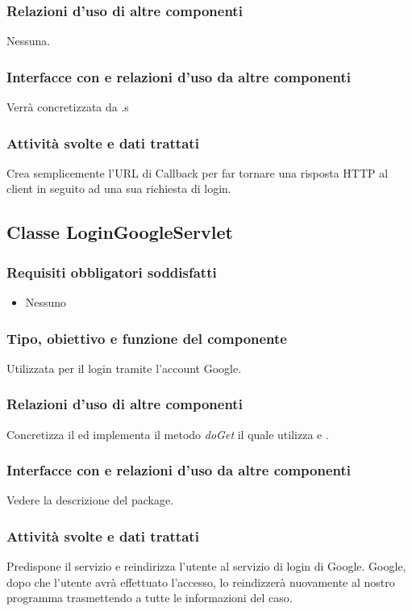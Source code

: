 \subsubsection*{Relazioni d'uso di altre componenti}
Nessuna.
\subsubsection*{Interfacce con e relazioni d'uso da altre componenti}
Verr\`a concretizzata da .s
\subsubsection*{Attivit\`a svolte e dati trattati}
Crea semplicemente l'URL di Callback per far tornare una risposta HTTP al
client in seguito ad una sua richiesta di login.

\subsection{Classe LoginGoogleServlet}
\subsubsection*{Requisiti obbligatori soddisfatti}
\begin{itemize}
    \item Nessuno
\end{itemize}
\subsubsection*{Tipo, obiettivo e funzione del componente}
Utilizzata per il login tramite l'account Google.
\subsubsection*{Relazioni d'uso di altre componenti}
Concretizza il  ed implementa il metodo \emph{doGet} il
quale utilizza  e .
\subsubsection*{Interfacce con e relazioni d'uso da altre componenti}
Vedere la descrizione del package.
\subsubsection*{Attivit\`a svolte e dati trattati}
Predispone il servizio e reindirizza l'utente al servizio di login di Google.
Google, dopo che l'utente avr\`a effettuato l'accesso, lo reindizzer\`a nuovamente
al nostro programma trasmettendo a  tutte le
informazioni del caso.

